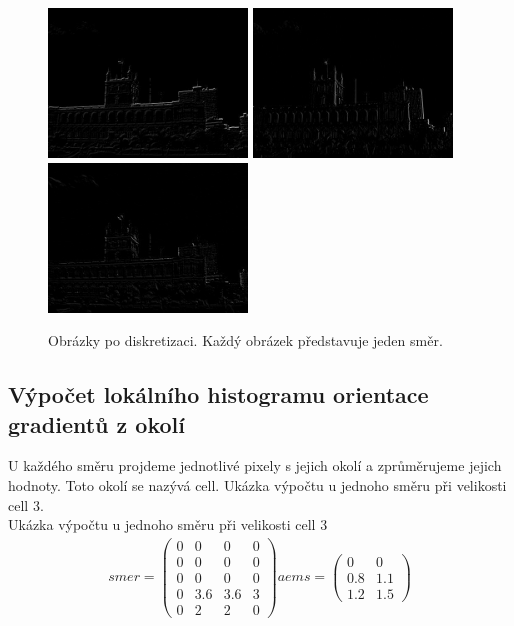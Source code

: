 \documentclass{report}
\begin{document}
\begin{figure}[ht]
	\centering
	\includegraphics[width=150pt]{./img/directional0.jpg}
	\includegraphics[width=150pt]{./img/directional1.jpg}
	\includegraphics[width=150pt]{./img/directional2.jpg}
	\caption{Obrázky po diskretizaci. Každý obrázek představuje jeden směr.}
\end{figure}


\subsection{Výpočet lokálního histogramu orientace gradientů z okolí}
U každého směru projdeme jednotlivé pixely s jejich okolí a zprůměrujeme jejich hodnoty. Toto okolí se nazývá cell. Ukázka výpočtu u jednoho směru při velikosti cell 3. \\
 
Ukázka výpočtu u jednoho směru při velikosti cell 3
\begin{align}
	\label{aems}
		smer = \begin{pmatrix}0 & 0 & 0 & 0 \\ 0 & 0 & 0 & 0 \\0 & 0 & 0 & 0 \\ 0 & 3.6 & 3.6 & 3 \\ 0 & 2 & 2 & 0 \end{pmatrix}
		aems = \begin{pmatrix}0 & 0 \\ 0.8 & 1.1 \\ 1.2 & 1.5 \end{pmatrix}
\end{align}
\end{document}
